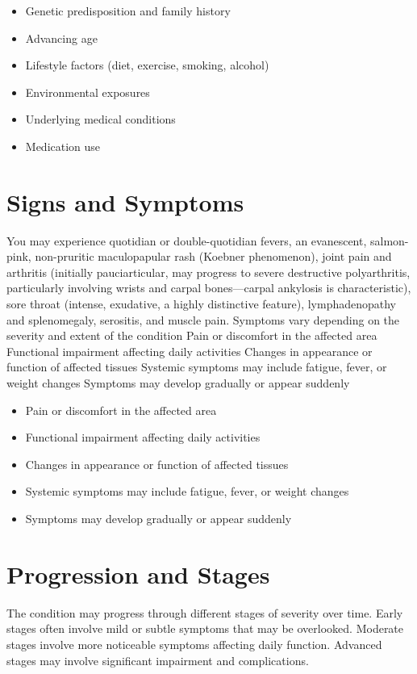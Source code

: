 \begin{itemize}[noitemsep]
  \item Genetic predisposition and family history
  \item Advancing age
  \item Lifestyle factors (diet, exercise, smoking, alcohol)
  \item Environmental exposures
  \item Underlying medical conditions
  \item Medication use
\end{itemize}
\section{Signs and Symptoms}
You may experience quotidian or double-quotidian fevers, an evanescent, salmon-pink, non-pruritic maculopapular rash (Koebner phenomenon), joint pain and arthritis (initially pauciarticular, may progress to severe destructive polyarthritis, particularly involving wrists and carpal bones---carpal ankylosis is characteristic), sore throat (intense, exudative, a highly distinctive feature), lymphadenopathy and splenomegaly, serositis, and muscle pain. Symptoms vary depending on the severity and extent of the condition Pain or discomfort in the affected area Functional impairment affecting daily activities Changes in appearance or function of affected tissues Systemic symptoms may include fatigue, fever, or weight changes Symptoms may develop gradually or appear suddenly

\begin{itemize}[noitemsep]
  \item Pain or discomfort in the affected area
  \item Functional impairment affecting daily activities
  \item Changes in appearance or function of affected tissues
  \item Systemic symptoms may include fatigue, fever, or weight changes
  \item Symptoms may develop gradually or appear suddenly
\end{itemize}
\section{Progression and Stages}
The condition may progress through different stages of severity over time. Early stages often involve mild or subtle symptoms that may be overlooked. Moderate stages involve more noticeable symptoms affecting daily function. Advanced stages may involve significant impairment and complications.
